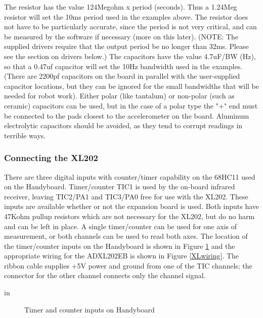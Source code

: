 \documentclass{article}
\begin{document}
The resistor has the value 124Megohm x period (seconds).  Thus a
1.24Meg resistor will set the 10ms period used in the examples above.
The resistor does not have to be particularly accurate, since the
period is not very critical, and can be measured by the software if
necessary (more on this later).  (NOTE: The supplied drivers require
that the output period be no longer than 32ms.  Please see the section
on drivers below.)  The capacitors have the value 4.7uF/BW (Hz), so
that a 0.47uf capacitor will set the 10Hz bandwidth used in the
examples.  (There are 2200pf capacitors on the board in parallel with
the user-supplied capacitor locations, but they can be ignored for the
small bandwidths that will be needed for robot work).  Either polar
(like tantalum) or non-polar (such as ceramic) capacitors can be used,
but in the case of a polar type the "+" end must be connected to the
pads closest to the accelerometer on the board.  Aluminum electrolytic
capacitors should be avoided, as they tend to corrupt readings in
terrible ways.

\subsubsection{Connecting the XL202}

There are three digital inputs with counter/timer capability on the
68HC11 used on the Handyboard.  Timer/counter TIC1 is used by the
on-board infrared receiver, leaving TIC2/PA1 and TIC3/PA0 free for use
with the XL202.  These inputs are available whether or not the
expansion board is used.  Both inputs have 47Kohm pullup resistors
which are not necessary for the XL202, but do no harm and can be left
in place.  A single timer/counter can be used for one axis of
measurement, or both channels can be used to read both axes.  The
location of the timer/counter inputs on the Handyboard is shown in
Figure \ref{HBinput} and the appropriate wiring for the ADXL202EB is shown in
Figure \ref{XLwiring}.  The ribbon cable supplies +5V power and ground from one of
the TIC channels; the connector for the other channel connects only
the channel signal.

 in
\begin{figure}[htbp]
\begin{center}
\caption{Timer and counter inputs on Handyboard}
\label{HBinput}
\end{center}
\end{figure}

\end{document}
